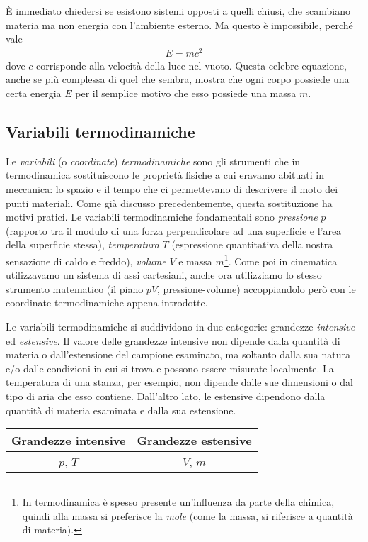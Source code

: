 \noindent È immediato chiedersi se esistono sistemi opposti a quelli chiusi, che
scambiano materia ma non energia con l'ambiente esterno. Ma questo
è impossibile, perché vale
\begin{align}
    E = mc^2
\end{align}
\noindent dove $c$ corrisponde alla velocità della luce nel vuoto.
Questa celebre equazione, anche se più complessa di quel che
sembra, mostra che ogni corpo possiede una certa energia $E$ per il semplice
motivo che esso possiede una massa $m$.

\subsection{Variabili termodinamiche}
Le \textit{variabili} (o \textit{coordinate}) \textit{termodinamiche}
sono gli strumenti che in termodinamica sostituiscono le proprietà
fisiche a cui eravamo abituati in meccanica: lo spazio e il tempo
che ci permettevano di descrivere il moto dei punti materiali.
Come già discusso precedentemente, questa sostituzione ha motivi pratici.
Le variabili termodinamiche fondamentali sono \textit{pressione} $p$
(rapporto tra il modulo di una forza perpendicolare ad una superficie
e l'area della superficie stessa), \textit{temperatura} $T$ (espressione
quantitativa della nostra sensazione di caldo e freddo), \textit{volume} $V$
e massa $m$\footnote{In termodinamica è spesso presente un'influenza da parte
della chimica, quindi alla massa si preferisce la \textit{mole} (come
la massa, si riferisce a quantità di materia).}. Come poi in cinematica
utilizzavamo un sistema di assi cartesiani, anche ora utilizziamo lo
stesso strumento matematico (il piano $pV$, pressione-volume) accoppiandolo però con le coordinate termodinamiche
appena introdotte.

Le variabili termodinamiche si suddividono in due categorie:
grandezze \textit{intensive} ed \textit{estensive}. Il valore delle
grandezze intensive non dipende dalla quantità di materia o dall'estensione
del campione esaminato, ma soltanto dalla sua natura e/o dalle
condizioni in cui si trova e possono essere misurate localmente.
La temperatura di una stanza, per esempio, non dipende dalle sue
dimensioni o dal tipo di aria che esso contiene. Dall'altro lato,
le estensive dipendono dalla quantità di materia esaminata e dalla
sua estensione.

\begin{center}
    \begin{tabular}{c || c}
        Grandezze intensive & Grandezze estensive\\
        \hline
        $p$, $T$ & $V$, $m$
    \end{tabular}
\end{center}


